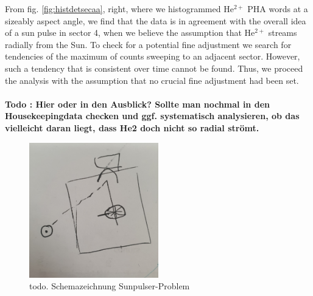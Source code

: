 From fig. \ref{fig:histdetsecaa}, right, where we histogrammed $\mathrm{He^{2+}}$ PHA words at a sizeably aspect angle, we find that the data is in agreement with the overall idea of a sun pulse in sector 4, when we believe the assumption that $\mathrm{He^{2+}}$ streams radially from the Sun. 
To check for a potential fine adjustment we search for tendencies of the maximum of counts sweeping to an adjacent sector. However, such a tendency that is consistent over time cannot be found. Thus, we proceed the analysis with the assumption that no crucial fine adjustment had been set. 
\\ \\
\textbf{Todo : Hier oder in den Ausblick? Sollte man nochmal in den Housekeepingdata checken und ggf. systematisch analysieren, ob das vielleicht daran liegt, dass He2 doch nicht so radial strömt.}
\\
\begin{figure}[h]
	\includegraphics[width=0.5\textwidth]{Figures/dummy_sunpulse.jpg}
	\centering
	\caption{todo. Schemazeichnung Sunpulser-Problem}
	\label{fig:sp}
\end{figure}
